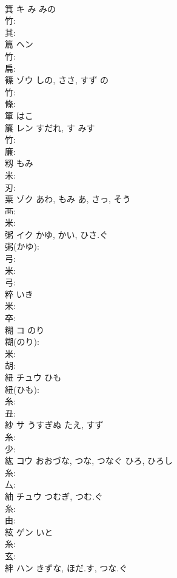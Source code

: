 \documentclass[8pt]{extreport}
\begin{document}
\begin{CJK}{UTF8}{min}
\\	箕	キ	み	みの	
\\	竹: 
\\	其: 
\\	篇	ヘン			
\\	竹: 
\\	扁: 
\\	篠	ゾウ	しの, ささ, すず	の	
\\	竹: 
\\	條: 
\\	簞		はこ				
\\	簾	レン	すだれ, す	みす	
\\	竹: 
\\	廉: 
\\	籾		もみ			
\\	米: 
\\	刃: 
\\	粟	ゾク	あわ, もみ	あ, さっ, そう	
\\	襾: 
\\	米: 
\\	粥	イク	かゆ, かい, ひさ.ぐ		
\\	粥(かゆ): 
\\	弓: 
\\	米: 
\\	弓: 
\\	粹		いき				
\\	米: 
\\	卒: 
\\	糊	コ	のり		
\\	糊(のり): 
\\	米: 
\\	胡: 
\\	紐	チュウ	ひも		
\\	紐(ひも): 
\\	糸: 
\\	丑: 
\\	紗	サ	うすぎぬ	たえ, すず	
\\	糸: 
\\	少: 
\\	紘	コウ	おおづな, つな, つなぐ	ひろ, ひろし	
\\	糸: 
\\	厶: 
\\	紬	チュウ	つむぎ, つむ.ぐ		
\\	糸: 
\\	由: 
\\	絃	ゲン	いと		
\\	糸: 
\\	玄: 
\\	絆	ハン	きずな, ほだ.す, つな.ぐ		

\end{CJK}
\end{document}
